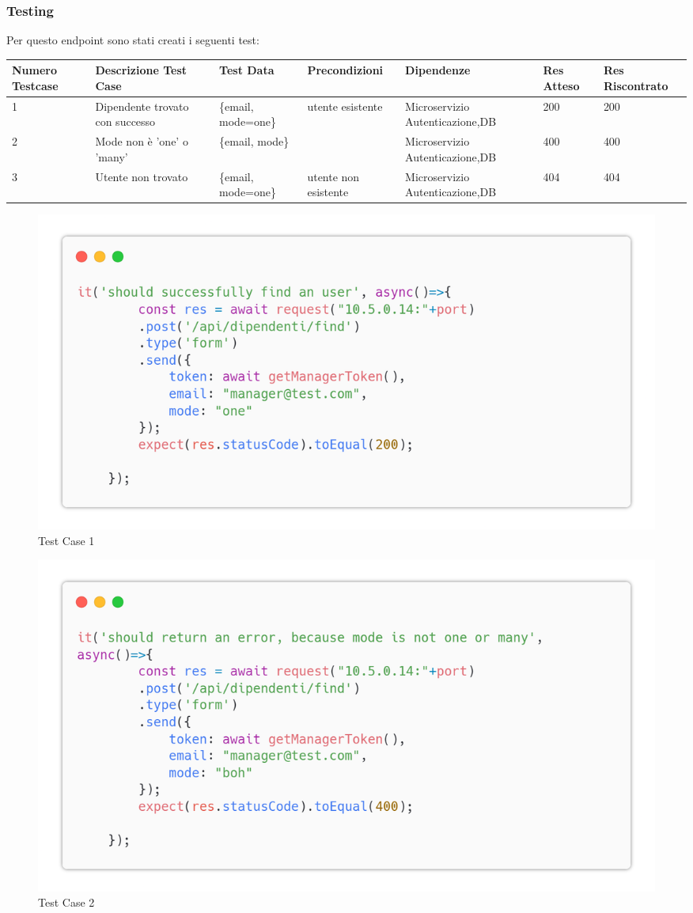 \documentclass{report}
\begin{document}
\subsubsection*{Testing}
Per questo endpoint sono stati creati i seguenti test:
\begin{center} %
	\centering
	\begin{tabular}{ |p{1cm}|p{2cm}|p{2cm}|p{2cm}|p{2cm}|p{1cm}|p{1cm}| }
		\hline
		Numero Testcase & Descrizione Test Case & Test Data                   & Precondizioni                                          & Dipendenze & Res Atteso & Res Riscontrato \\
		\hline
		1               & Dipendente trovato con successo & \{email, mode=one\}  & utente esistente &  Microservizio Autenticazione,DB         & 200        & 200             \\
		\hline
		2               & Mode non è 'one' o 'many'   & \{email, mode\}  &  &  Microservizio Autenticazione,DB         & 400        & 400           \\
		\hline
		3              & Utente non trovato   & \{email, mode=one\}  & utente non esistente &  Microservizio Autenticazione,DB         & 404      & 404          \\
		\hline
	\end{tabular}
\end{center}
\begin{figure}[H]
	\centering\includegraphics[width=1\textwidth]{images/microservizio-dipendenti/tests/find_test_1.png}
	\caption{Test Case 1}
\end{figure}
\begin{figure}[H]
	\centering\includegraphics[width=1\textwidth]{images/microservizio-dipendenti/tests/find_test_2.png}
	\caption{Test Case 2}
\end{figure}
\end{document}
